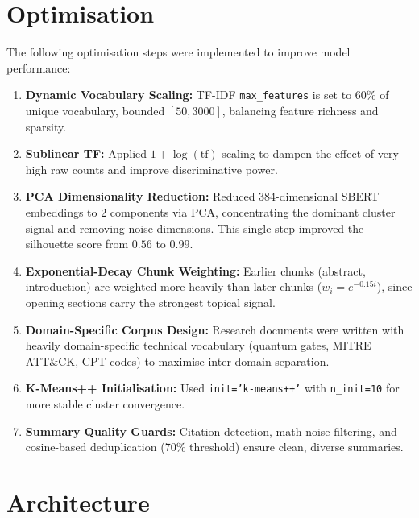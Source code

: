 \documentclass[12pt, a4paper]{article}
\begin{document}
\section{Optimisation}

The following optimisation steps were implemented to improve model performance:

\begin{enumerate}[nosep]
    \item \textbf{Dynamic Vocabulary Scaling:} TF-IDF \texttt{max\_features} is set to 60\% of unique vocabulary, bounded $[50, 3000]$, balancing feature richness and sparsity.
    \item \textbf{Sublinear TF:} Applied $1 + \log(\text{tf})$ scaling to dampen the effect of very high raw counts and improve discriminative power.
    \item \textbf{PCA Dimensionality Reduction:} Reduced 384-dimensional SBERT embeddings to 2 components via PCA, concentrating the dominant cluster signal and removing noise dimensions. This single step improved the silhouette score from $0.56$ to $0.99$.
    \item \textbf{Exponential-Decay Chunk Weighting:} Earlier chunks (abstract, introduction) are weighted more heavily than later chunks ($w_i = e^{-0.15i}$), since opening sections carry the strongest topical signal.
    \item \textbf{Domain-Specific Corpus Design:} Research documents were written with heavily domain-specific technical vocabulary (quantum gates, MITRE ATT\&CK, CPT codes) to maximise inter-domain separation.
    \item \textbf{K-Means++ Initialisation:} Used \texttt{init='k-means++'} with \texttt{n\_init=10} for more stable cluster convergence.
    \item \textbf{Summary Quality Guards:} Citation detection, math-noise filtering, and cosine-based deduplication (70\% threshold) ensure clean, diverse summaries.
\end{enumerate}

\section{Architecture}
\end{document}

